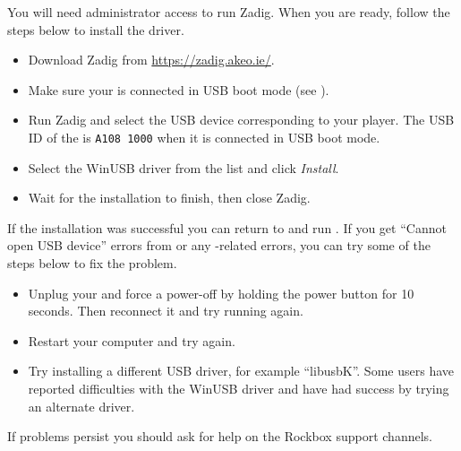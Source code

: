 
You will need administrator access to run Zadig. When you are ready, follow the
steps below to install the driver.

\begin{itemize}
\item Download Zadig from \url{https://zadig.akeo.ie/}.
\item Make sure your \dap{} is connected in USB boot mode
  (see ).
\item Run Zadig and select the USB device corresponding to your player.
  The USB ID of the \playername{} is \texttt{A108 1000} when it is connected in
  USB boot mode.
\item Select the WinUSB driver from the list and click \emph{Install}.
\item Wait for the installation to finish, then close Zadig.
\end{itemize}

If the installation was successful you can return to
 and run . If you get
``Cannot open USB device'' errors from  or any
-related errors, you can try some of the steps below to fix the
problem.

\begin{itemize}
\item Unplug your \dap{} and force a power-off by holding the power button
  for 10 seconds. Then reconnect it and try running  again.
\item Restart your computer and try again.
\item Try installing a different USB driver, for example ``libusbK''.
  Some users have reported difficulties with the WinUSB driver and have
  had success by trying an alternate driver.
\end{itemize}

If problems persist you should ask for help on the Rockbox support channels.
